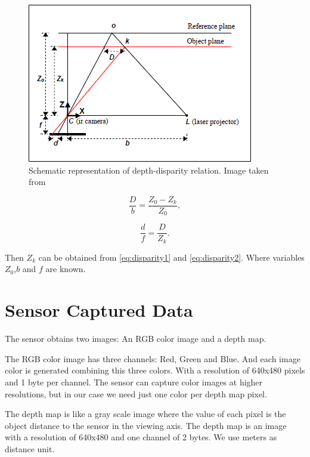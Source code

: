 \begin{figure}[h!]
\begin{center}
\includegraphics[scale=1.65]{images/kinect_triangulation}
\caption{Schematic representation of depth-disparity relation. Image taken from \cite{khoshelham2011accuracy}}
\label{fig:disparity}
\end{center}
\end{figure}

\begin{equation}
\label{eq:disparity1}
 \frac{D}{b} = \frac{Z_0 - Z_k}{Z_0},
\end{equation}


\begin{equation}
\label{eq:disparity2}
 \frac{d}{f} = \frac{D}{Z_k}. 
\end{equation}

Then $Z_k$ can be obtained from \ref{eq:disparity1} and \ref{eq:disparity2}. Where variables $Z_0$,$b$ and $f$ are known.

\section{Sensor Captured Data}
\label{sec:sensor_data}

The sensor obtains two images: An RGB color image and a depth map. 

The RGB color image has three channels: Red, Green and Blue. And each image color is generated 
combining this three colors. With a resolution of 640x480 pixels and 1 byte per channel. The sensor can 
capture color images at higher resolutions, but in our case we need just one color per depth map pixel.

The depth map is like a gray scale image where the value of each pixel is the object distance to the sensor in the viewing axis. 
The depth map is an image with a resolution of 640x480 and one channel of 2 bytes. We use meters as distance unit.


